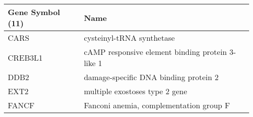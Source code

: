 \begin{tabular}{ll}
\toprule
Gene Symbol (11) &                                             Name \\
\midrule
            CARS &                        cysteinyl-tRNA synthetase \\
         CREB3L1 & cAMP responsive element binding protein 3-like 1 \\
            DDB2 &            damage-specific DNA binding protein 2 \\
            EXT2 &                   multiple exostoses type 2 gene \\
           FANCF &          Fanconi anemia, complementation group F \\
\bottomrule
\end{tabular}

